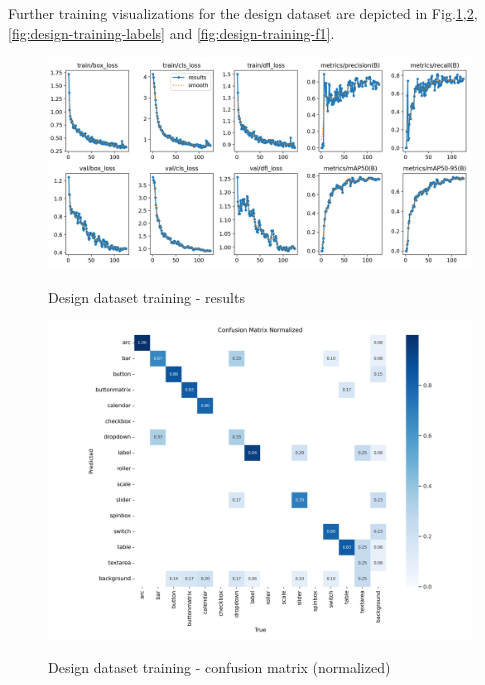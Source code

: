 \documentclass[Bachelor, BIC, english, fhCitStyle, IEEE]{BASE/twbook} %
\begin{document}
Further training visualizations for the design dataset are depicted in Fig.\ref{fig:design-training-results},\ref{fig:design-training-confusion},\ref{fig:design-training-labels} and \ref{fig:design-training-f1}.
\begin{figure}
    \caption{Design dataset training - results}
    \centering
    \includegraphics[width=\textwidth]{PICs/train373/results.png}
    \label{fig:design-training-results}
\end{figure}
\begin{figure}
    \caption{Design dataset training - confusion matrix (normalized)}
    \centering
    \includegraphics[width=\textwidth]{PICs/train373/confusion_matrix_normalized.png}
    \label{fig:design-training-confusion}
\end{figure}
\end{document}
